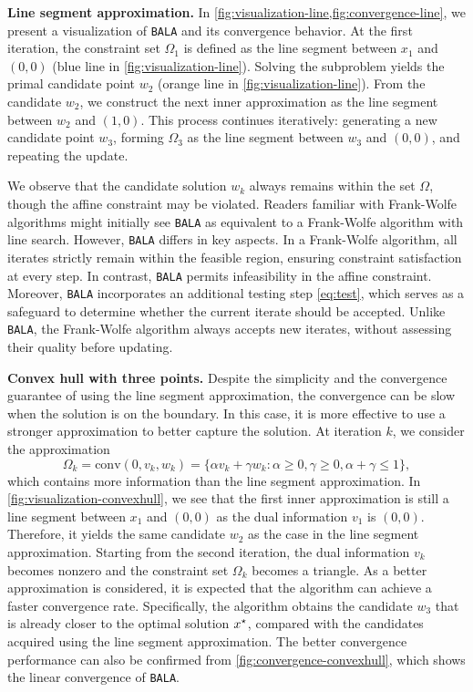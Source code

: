 \documentclass[11pt]{article}
\newcommand{\alg}{\texttt{BALA}}%
\begin{document}
\vspace{3pt}

\noindent \textbf{Line segment approximation.} 
In \cref{fig:visualization-line,fig:convergence-line}, we present a visualization of \alg{} and its convergence behavior.  
At the first iteration, the constraint set \(\Omega_1\) is defined as the line segment between \(x_1\) and \((0,0)\) (blue line in \cref{fig:visualization-line}). Solving the subproblem yields the primal candidate point \(w_2\) (orange line in \cref{fig:visualization-line}). From the candidate \(w_2\), we construct the next inner approximation as the line segment between \(w_2\) and \((1,0)\). This process continues iteratively: generating a new candidate point \(w_3\), forming \(\Omega_3\) as the line segment between \(w_3\) and \((0,0)\), and repeating the update.  

We observe that the candidate solution \(w_k\) always remains within the set \(\Omega\), though the affine constraint may be violated. Readers familiar with Frank-Wolfe algorithms might initially see \alg{} as equivalent to a Frank-Wolfe algorithm with line search. However, \alg{} differs in key aspects. In a Frank-Wolfe algorithm, all iterates strictly remain within the feasible region, ensuring constraint satisfaction at every step. In contrast, \alg{} permits infeasibility in the affine constraint. Moreover, \alg{} incorporates an additional testing step \eqref{eq:test}, which serves as a safeguard to determine whether the current iterate should be accepted. Unlike \alg{}, the Frank-Wolfe algorithm always accepts new iterates, without assessing their quality before updating.  


\vspace{3pt}

\noindent \textbf{Convex hull with three points.} 
Despite the simplicity and the convergence guarantee of using the line segment approximation, the convergence can be slow when the solution is on the boundary. In this case, it is more effective to use a stronger approximation to better capture the solution. At iteration $k$, we consider the approximation
\begin{equation*}
    \Omega_{k} = \mathrm{conv}(0,v_k,w_k) = \{\alpha v_k + \gamma w_k : \alpha \geq 0, \gamma \geq 0 , \alpha + \gamma \leq 1 \},
\end{equation*}
which contains more information than the line segment approximation. In \cref{fig:visualization-convexhull}, we see that the first inner approximation is still a line segment between $x_1$ and $(0,0)$ as the dual information $v_1$ is $(0,0)$. Therefore, it yields the same candidate $w_2$ as the case in the line segment approximation. Starting from the second iteration, the dual information $v_k$ becomes nonzero and the constraint set $\Omega_k$ becomes a triangle. As a better approximation is considered, it is expected that the algorithm can achieve a faster convergence rate. Specifically, the algorithm obtains the candidate $w_3$ that is already closer to the optimal solution $x^\star$, compared with the candidates acquired using the line segment approximation. The better convergence performance can also be confirmed from \cref{fig:convergence-convexhull}, which shows the linear convergence of \alg{}. 
\end{document}
